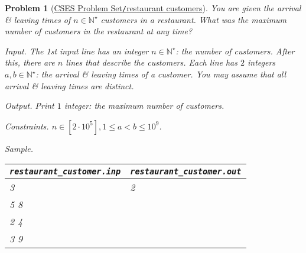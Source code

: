 \documentclass{article}
\newtheorem{problem}{Problem}
\begin{document}
\begin{problem}[\href{https://cses.fi/problemset/task/1619}{CSES Problem Set{\tt/}restaurant customers}]
    You are given the arrival \& leaving times of $n\in\mathbb{N}^\star$ customers in a restaurant. What was the maximum number of customers in the restaurant at any time?
    \item {\sf Input.} The 1st input line has an integer $n\in\mathbb{N}^\star$: the number of customers. After this, there are $n$ lines that describe the customers. Each line has $2$ integers $a,b\in\mathbb{N}^\star$: the arrival \& leaving times of a customer. You may assume that all arrival \& leaving times are distinct.
    \item {\sf Output.} Print $1$ integer: the maximum number of customers.
    \item {\sf Constraints.} $n\in[2\cdot10^5],1\le a < b\le10^9$.
    \item {\sf Sample.}
    \begin{table}[H]
        \centering
        \begin{tabular}{|l|l|}
            \hline
            \verb|restaurant_customer.inp| & \verb|restaurant_customer.out| \\
            \hline
            3 & 2 \\
            5 8 & \\
            2 4 & \\
            3 9 & \\
            \hline
        \end{tabular}
    \end{table}
\end{problem}
\end{document}
